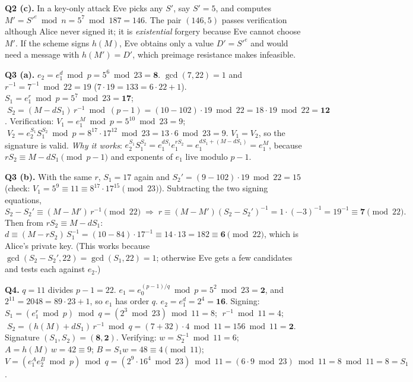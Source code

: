 \textbf{Q2 (c).} In a key-only attack Eve picks any $S'$, say $S' = 5$, and computes $M' = S'^e \bmod n = 5^7 \bmod 187 = 146$. The pair $(146, 5)$ passes verification although Alice never signed it; it is \emph{existential} forgery because Eve cannot choose $M'$. If the scheme signs $h(M)$, Eve obtains only a value $D' = S'^e$ and would need a message with $h(M') = D'$, which preimage resistance makes infeasible.

\textbf{Q3 (a).} $e_2 = e_1^d \bmod p = 5^6 \bmod 23 = \mathbf{8}$. $\gcd(7, 22) = 1$ and $r^{-1} = 7^{-1} \bmod 22 = 19$ ($7 \cdot 19 = 133 = 6 \cdot 22 + 1$).
$S_1 = e_1^r \bmod p = 5^7 \bmod 23 = \mathbf{17}$; $\;S_2 = (M - d S_1)\, r^{-1} \bmod (p - 1) = (10 - 102) \cdot 19 \bmod 22 = 18 \cdot 19 \bmod 22 = \mathbf{12}$.
Verification: $V_1 = e_1^M \bmod p = 5^{10} \bmod 23 = 9$; $\;V_2 = e_2^{S_1} S_1^{S_2} \bmod p = 8^{17} \cdot 17^{12} \bmod 23 = 13 \cdot 6 \bmod 23 = 9$. $V_1 = V_2$, so the signature is valid.
\emph{Why it works}: $e_2^{S_1} S_1^{S_2} = e_1^{d S_1} e_1^{r S_2} = e_1^{d S_1 + (M - d S_1)} = e_1^M$, because $r S_2 \equiv M - d S_1 \pmod{p - 1}$ and exponents of $e_1$ live modulo $p - 1$.

\textbf{Q3 (b).} With the same $r$, $S_1 = 17$ again and $S_2' = (9 - 102) \cdot 19 \bmod 22 = 15$ (check: $V_1 = 5^9 \equiv 11 \equiv 8^{17} \cdot 17^{15} \pmod{23}$). Subtracting the two signing equations,
\[
S_2 - S_2' \equiv (M - M')\, r^{-1} \pmod{22} \;\Rightarrow\; r \equiv (M - M')(S_2 - S_2')^{-1} = 1 \cdot (-3)^{-1} = 19^{-1} \equiv \mathbf 7 \pmod{22}.
\]
Then from $r S_2 \equiv M - d S_1$: $d \equiv (M - r S_2)\, S_1^{-1} = (10 - 84) \cdot 17^{-1} \equiv 14 \cdot 13 = 182 \equiv \mathbf 6 \pmod{22}$, which is Alice's private key. (This works because $\gcd(S_2 - S_2', 22) = \gcd(S_1, 22) = 1$; otherwise Eve gets a few candidates and tests each against $e_2$.)

\textbf{Q4.} $q = 11$ divides $p - 1 = 22$. $e_1 = e_0^{(p-1)/q} \bmod p = 5^2 \bmod 23 = \mathbf 2$, and $2^{11} = 2048 = 89 \cdot 23 + 1$, so $e_1$ has order $q$. $e_2 = e_1^d = 2^4 = \mathbf{16}$.
Signing: $S_1 = (e_1^r \bmod p) \bmod q = (2^3 \bmod 23) \bmod 11 = 8$; $\;r^{-1} \bmod 11 = 4$; $\;S_2 = (h(M) + d S_1)\, r^{-1} \bmod q = (7 + 32) \cdot 4 \bmod 11 = 156 \bmod 11 = \mathbf 2$. Signature $(S_1, S_2) = (\mathbf 8, \mathbf 2)$.
Verifying: $w = S_2^{-1} \bmod 11 = 6$; $A = h(M)\, w = 42 \equiv 9$; $B = S_1 w = 48 \equiv 4 \pmod{11}$;
$V = (e_1^A e_2^B \bmod p) \bmod q = (2^9 \cdot 16^4 \bmod 23) \bmod 11 = (6 \cdot 9 \bmod 23) \bmod 11 = 8 \bmod 11 = 8 = S_1$ \checkmark.

